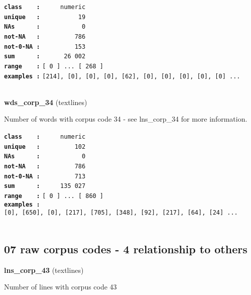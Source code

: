 \documentclass[]{article}
\begin{document}
\textbf{\texttt{class\ \ \ \ :}} \texttt{~~~~~numeric}\\
\textbf{\texttt{unique\ \ \ :}} \texttt{~~~~~~~~~~19}\\
\textbf{\texttt{NAs\ \ \ \ \ \ :}} \texttt{~~~~~~~~~~~0}\\
\textbf{\texttt{not-NA\ \ \ :}} \texttt{~~~~~~~~~786}\\
\textbf{\texttt{not-0-NA\ :}} \texttt{~~~~~~~~~153}\\
\textbf{\texttt{sum\ \ \ \ \ \ :}} \texttt{~~~~~~26~002}\\
\textbf{\texttt{range\ \ \ \ :}}
\texttt{{[}\ 0\ {]}\ ...\ {[}\ 268\ {]}}\\
\textbf{\texttt{examples\ :}}
\texttt{{[}214{]},\ {[}0{]},\ {[}0{]},\ {[}0{]},\ {[}62{]},\ {[}0{]},\ {[}0{]},\ {[}0{]},\ {[}0{]},\ {[}0{]}\ ...}\\

~

\textbf{wds\_corp\_34} (textlines)

Number of words with corpus code 34 - see lns\_corp\_34 for more
information.

\textbf{\texttt{class\ \ \ \ :}} \texttt{~~~~~numeric}\\
\textbf{\texttt{unique\ \ \ :}} \texttt{~~~~~~~~~102}\\
\textbf{\texttt{NAs\ \ \ \ \ \ :}} \texttt{~~~~~~~~~~~0}\\
\textbf{\texttt{not-NA\ \ \ :}} \texttt{~~~~~~~~~786}\\
\textbf{\texttt{not-0-NA\ :}} \texttt{~~~~~~~~~713}\\
\textbf{\texttt{sum\ \ \ \ \ \ :}} \texttt{~~~~~135~027}\\
\textbf{\texttt{range\ \ \ \ :}}
\texttt{{[}\ 0\ {]}\ ...\ {[}\ 860\ {]}}\\
\textbf{\texttt{examples\ :}}
\texttt{{[}0{]},\ {[}650{]},\ {[}0{]},\ {[}217{]},\ {[}705{]},\ {[}348{]},\ {[}92{]},\ {[}217{]},\ {[}64{]},\ {[}24{]}\ ...}\\

~

\subsection{07 raw corpus codes - 4 relationship to
others}\label{raw-corpus-codes---4-relationship-to-others}

\textbf{lns\_corp\_43} (textlines)

Number of lines with corpus code 43
\end{document}
